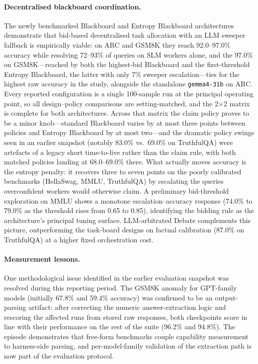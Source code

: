 \paragraph{Decentralised blackboard coordination.}
The newly benchmarked Blackboard and Entropy Blackboard architectures demonstrate that bid-based decentralised task allocation with an LLM sweeper fallback is empirically viable: on ARC and GSM8K they reach 92.0--97.0\% accuracy while resolving 72--93\% of queries on SLM workers alone, and the 97.0\% on GSM8K---reached by both the highest-bid Blackboard and the first-threshold Entropy Blackboard, the latter with only 7\% sweeper escalation---ties for the highest raw accuracy in the study, alongside the standalone \texttt{gemma4-31b} on ARC. Every reported configuration is a single 100-sample run at the principal operating point, so all design--policy comparisons are setting-matched, and the 2$\times$2 matrix is complete for both architectures. Across that matrix the claim policy proves to be a minor knob---standard Blackboard varies by at most three points between policies and Entropy Blackboard by at most two---and the dramatic policy swings seen in an earlier snapshot (notably 83.0\% vs.\ 69.0\% on TruthfulQA) were artefacts of a legacy short time-to-live rather than the claim rule, with both matched policies landing at 68.0--69.0\% there. What actually moves accuracy is the entropy penalty: it recovers three to seven points on the poorly calibrated benchmarks (HellaSwag, MMLU, TruthfulQA) by escalating the queries overconfident workers would otherwise claim. A preliminary bid-threshold exploration on MMLU shows a monotone escalation--accuracy response (74.0\% to 79.0\% as the threshold rises from 0.65 to 0.85), identifying the bidding rule as the architecture's principal tuning surface. LLM-arbitrated Debate complements this picture, outperforming the task-board designs on factual calibration (87.0\% on TruthfulQA) at a higher fixed orchestration cost.

\paragraph{Measurement lessons.}
One methodological issue identified in the earlier evaluation snapshot was resolved during this reporting period. The GSM8K anomaly for GPT-family models (initially 67.8\% and 59.4\% accuracy) was confirmed to be an output-parsing artifact: after correcting the numeric answer-extraction logic and rescoring the affected runs from stored raw responses, both checkpoints score in line with their performance on the rest of the suite (96.2\% and 94.8\%). The episode demonstrates that free-form benchmarks couple capability measurement to harness-side parsing, and per-model-family validation of the extraction path is now part of the evaluation protocol.

